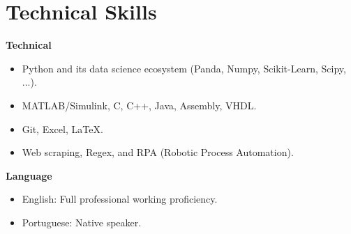 \section{Technical Skills}
\textbf{Technical}
 \begin{itemize}[leftmargin=0.15in, label={-}]
   \item{Python and its data science ecosystem (Panda, Numpy, Scikit-Learn, Scipy, ...).}
   \item MATLAB/Simulink, C, C++, Java, Assembly, VHDL.
   \item Git, Excel, \LaTeX.
   \item Web scraping, Regex, and RPA (Robotic Process Automation).
 \end{itemize}
 \textbf{Language}
 \begin{itemize}[leftmargin=0.15in, label={-}]
    \item English: Full professional working proficiency.
    \item Portuguese: Native speaker.
 \end{itemize}